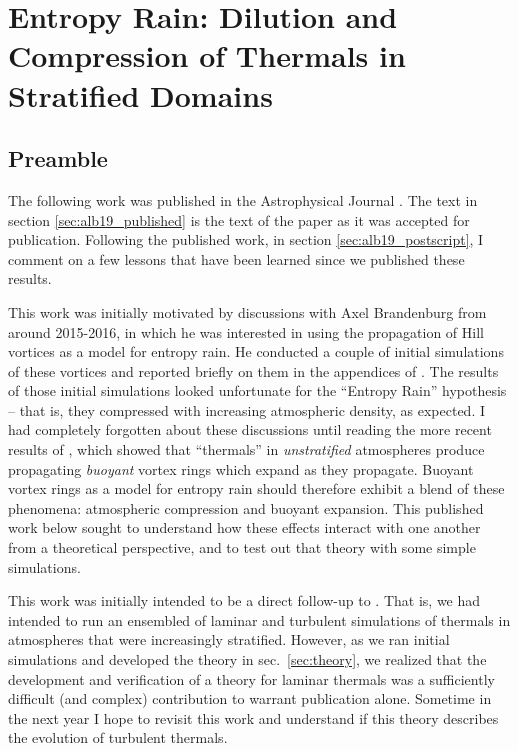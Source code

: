 \chapter{Entropy Rain: Dilution and Compression of Thermals in Stratified Domains}
\label{ch:alb19}

\section{Preamble}
The following work was published in the Astrophysical Journal \citep{andersLB2019}.
The text in section \ref{sec:alb19_published} is the text of the paper as it was accepted for publication.
Following the published work, in section \ref{sec:alb19_postscript}, I comment on a few lessons that have been learned since we published these results.

This work was initially motivated by discussions with Axel Brandenburg from around 2015-2016, in which he was interested in using the propagation of Hill vortices as a model for entropy rain.
He conducted a couple of initial simulations of these vortices and reported briefly on them in the appendices of \cite{brandenburg2016}.
The results of those initial simulations looked unfortunate for the ``Entropy Rain'' hypothesis -- that is, they compressed with increasing atmospheric density, as expected.
I had completely forgotten about these discussions until reading the more recent results of \cite{lecoanet&jeevanjee2019}, which showed that ``thermals'' in \emph{unstratified} atmospheres produce propagating \emph{buoyant} vortex rings which expand as they propagate.
Buoyant vortex rings as a model for entropy rain should therefore exhibit a blend of these phenomena: atmospheric compression and buoyant expansion.
This published work below sought to understand how these effects interact with one another from a theoretical perspective, and to test out that theory with some simple simulations.

This work was initially intended to be a direct follow-up to \cite{lecoanet&jeevanjee2019}.
That is, we had intended to run an ensembled of laminar and turbulent simulations of thermals in atmospheres that were increasingly stratified.
However, as we ran initial simulations and developed the theory in sec.~\ref{sec:theory}, we realized that the development and verification of a theory for laminar thermals was a sufficiently difficult (and complex) contribution to warrant publication alone.
Sometime in the next year I hope to revisit this work and understand if this theory describes the evolution of turbulent thermals.


